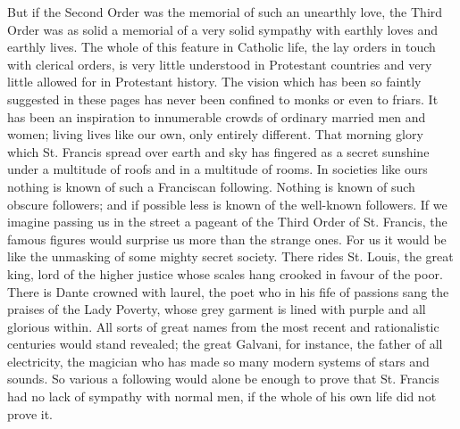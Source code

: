 \documentclass{book}
\begin{document}
But if the Second Order was the memorial of such an unearthly love, the Third Order was as solid a memorial of a very solid sympathy with earthly loves and earthly lives. The whole of this feature in Catholic life, the lay orders in touch with clerical orders, is very little understood in Protestant countries and very little allowed for in Protestant history. The vision which has been so faintly suggested in these pages has never been confined to monks or even to friars. It has been an inspiration to innumerable crowds of ordinary married men and women; living lives like our own, only entirely different. That morning glory which St. Francis spread over earth and sky has fingered as a secret sunshine under a multitude of roofs and in a multitude of rooms. In societies like ours nothing is known of such a Franciscan following. Nothing is known of such obscure followers; and if possible less is known of the well-known followers. If we imagine passing us in the street a pageant of the Third Order of St. Francis, the famous figures would surprise us more than the strange ones. For us it would be like the unmasking of some mighty secret society. There rides St. Louis, the great king, lord of the higher justice whose scales hang crooked in favour of the poor. There is Dante crowned with laurel, the poet who in his fife of passions sang the praises of the Lady Poverty, whose grey garment is lined with purple and all glorious within. All sorts of great names from the most recent and rationalistic centuries would stand revealed; the great Galvani, for instance, the father of all electricity, the magician who has made so many modern systems of stars and sounds. So various a following would alone be enough to prove that St. Francis had no lack of sympathy with normal men, if the whole of his own life did not prove it.
\end{document}
